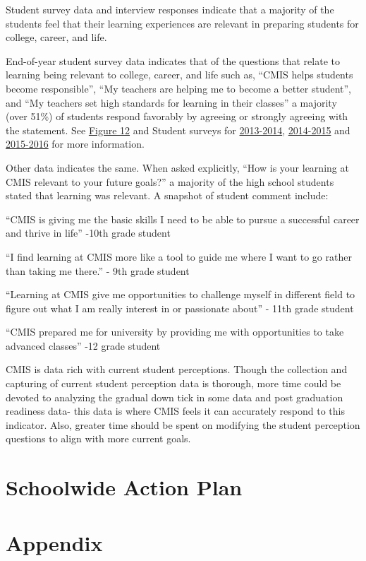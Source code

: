 \documentclass{report}
\begin{document}
\begin{findings}

Student survey data and interview responses indicate that a majority of the students feel that their learning experiences are relevant in preparing students for  college, career, and life. 

End-of-year student survey data indicates that of the questions that relate to learning being relevant to college, career, and life such as, “CMIS helps students become responsible”, “My teachers are helping me to become a better student”, and “My teachers set high standards for learning in their classes” a majority (over 51\%) of students respond favorably by agreeing or strongly agreeing with the statement.  See \href{https://docs.google.com/document/d/1DO6UYDibCyF0wjGx1Pi7tgKJYMqpfjzTcICvsf8UUWM/edit}{Figure 12} and Student surveys for  \href{https://docs.google.com/a/cmis.ac.th/forms/d/1EbMhxXKv9boAXmuwqmldZCbHKNY-aREq56IW2N-eviI/viewanalytics}{2013-2014}, \href{https://docs.google.com/a/cmis.ac.th/forms/d/1qbAnJ69O0ZRUPmBFvQaglObvnyoUkVd4hQiyaAFO7_I/viewanalytics}{2014-2015} and \href{https://docs.google.com/a/cmis.ac.th/forms/d/1n7vFCQbPQmF6pEPJKPBsu4rzdiW4KQ_DrBcjTMUbLH4/edit?ts=587d7b50#responses}{2015-2016} for more information. 

Other data indicates the same. When asked explicitly, “How is your learning at CMIS relevant to your future goals?” a majority of the high school students stated that learning was relevant.  A snapshot of student comment include: 

``CMIS is giving me the basic skills I need to be able to pursue a successful career and thrive in life'' -10th grade student
 
``I find learning at CMIS more like a tool to guide me where I want to go rather than taking me there.'' - 9th grade student 

``Learning at CMIS give me opportunities to challenge myself in different field to figure out what I am really interest in or passionate about'' - 11th grade student

``CMIS prepared me for university by  providing me with opportunities  to take advanced classes'' -12 grade student 


CMIS is data rich with current student perceptions. Though the collection and capturing of current student perception data is thorough, more time could be devoted to analyzing the gradual down tick in some data and post graduation readiness data- this data is where CMIS feels it can accurately respond to this indicator. Also, greater time should be spent on modifying the student perception questions to align with more current goals.  

\end{findings}
\chapter{Schoolwide Action Plan}
\chapter{Appendix}
\listoffigures
\listoftables
\end{document}
